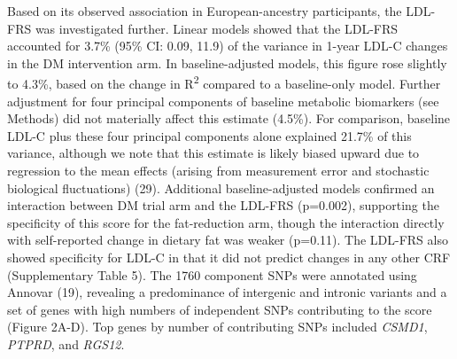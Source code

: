 \documentclass[]{article}
\begin{document}
Based on its observed association in European-ancestry participants, the
LDL-FRS was investigated further. Linear models showed that the LDL-FRS
accounted for 3.7\% (95\% CI: 0.09, 11.9) of the variance in 1-year
LDL-C changes in the DM intervention arm. In baseline-adjusted models,
this figure rose slightly to 4.3\%, based on the change in
R\textsuperscript{2} compared to a baseline-only model. Further
adjustment for four principal components of baseline metabolic
biomarkers (see Methods) did not materially affect this estimate
(4.5\%). For comparison, baseline LDL-C plus these four principal
components alone explained 21.7\% of this variance, although we note
that this estimate is likely biased upward due to regression to the mean
effects (arising from measurement error and stochastic biological
fluctuations) (29). Additional baseline-adjusted models confirmed an
interaction between DM trial arm and the LDL-FRS (p=0.002), supporting
the specificity of this score for the fat-reduction arm, though the
interaction directly with self-reported change in dietary fat was weaker
(p=0.11). The LDL-FRS also showed specificity for LDL-C in that it did
not predict changes in any other CRF (Supplementary Table 5). The 1760
component SNPs were annotated using Annovar (19), revealing a
predominance of intergenic and intronic variants and a set of genes with
high numbers of independent SNPs contributing to the score (Figure
2A-D). Top genes by number of contributing SNPs included \emph{CSMD1},
\emph{PTPRD}, and \emph{RGS12}.
\end{document}
